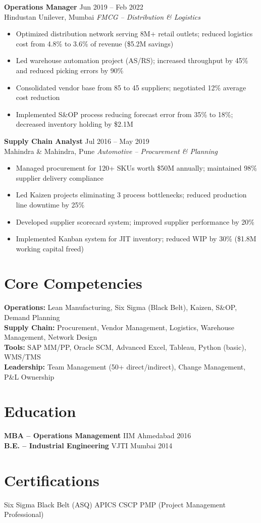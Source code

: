 \documentclass[10pt,a4paper]{article}
\begin{document}
\textbf{Operations Manager} \hfill Jun 2019 -- Feb 2022\\
{\color{accent}Hindustan Unilever, Mumbai} \enspace\textbar\enspace \textit{FMCG -- Distribution \& Logistics}
\begin{itemize}
  \item Optimized distribution network serving 8M+ retail outlets; reduced logistics cost from 4.8\% to 3.6\% of revenue (\$5.2M savings)
  \item Led warehouse automation project (AS/RS); increased throughput by 45\% and reduced picking errors by 90\%
  \item Consolidated vendor base from 85 to 45 suppliers; negotiated 12\% average cost reduction
  \item Implemented S\&OP process reducing forecast error from 35\% to 18\%; decreased inventory holding by \$2.1M
\end{itemize}

\textbf{Supply Chain Analyst} \hfill Jul 2016 -- May 2019\\
{\color{accent}Mahindra \& Mahindra, Pune} \enspace\textbar\enspace \textit{Automotive -- Procurement \& Planning}
\begin{itemize}
  \item Managed procurement for 120+ SKUs worth \$50M annually; maintained 98\% supplier delivery compliance
  \item Led Kaizen projects eliminating 3 process bottlenecks; reduced production line downtime by 25\%
  \item Developed supplier scorecard system; improved supplier performance by 20\%
  \item Implemented Kanban system for JIT inventory; reduced WIP by 30\% (\$1.8M working capital freed)
\end{itemize}

\section{Core Competencies}
\textbf{Operations:} Lean Manufacturing, Six Sigma (Black Belt), Kaizen, S\&OP, Demand Planning\\
\textbf{Supply Chain:} Procurement, Vendor Management, Logistics, Warehouse Management, Network Design\\
\textbf{Tools:} SAP MM/PP, Oracle SCM, Advanced Excel, Tableau, Python (basic), WMS/TMS\\
\textbf{Leadership:} Team Management (50+ direct/indirect), Change Management, P\&L Ownership

\section{Education}
\textbf{MBA -- Operations Management} \hfill IIM Ahmedabad \hfill 2016\\
\textbf{B.E. -- Industrial Engineering} \hfill VJTI Mumbai \hfill 2014

\section{Certifications}
Six Sigma Black Belt (ASQ) \quad\textbar\quad APICS CSCP \quad\textbar\quad PMP (Project Management Professional)
\end{document}
